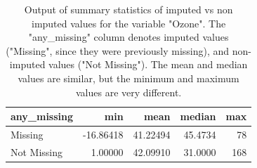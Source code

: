 \documentclass{article}\usepackage[]{graphicx}\usepackage[]{xcolor}
\newenvironment{knitrout}{}{} %
\begin{document}
\begin{knitrout}
\color{fgcolor}\begin{table}

\caption{\label{tab:impute-summary-out}Output of  summary statistics of imputed vs non imputed values for the variable "Ozone". The "any\_missing" column denotes imputed values ("Missing", since they were previously missing), and non-imputed values ("Not Missing"). The mean and median values are similar, but the minimum and maximum values are very different.}
\centering
\begin{tabular}[t]{l|r|r|r|r}
\hline
any\_missing & min & mean & median & max\\
\hline
Missing & -16.86418 & 41.22494 & 45.4734 & 78\\
\hline
Not Missing & 1.00000 & 42.09910 & 31.0000 & 168\\
\hline
\end{tabular}
\end{table}

\end{knitrout}
\end{document}
